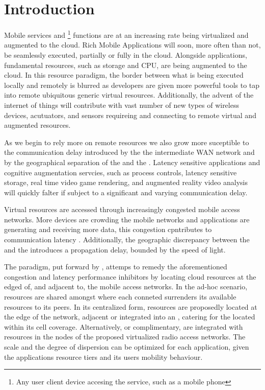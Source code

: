 \section{Introduction}

Mobile services and \ue{} \footnote{Any user client device accesing the service, such as a mobile phone} functions are at an increasing rate being virtualized and augmented to the cloud. Rich Mobile Applications \cite{March2011618} will soon, more often than not, be seamlessly executed, partially or fully in the cloud. Alongside applications, fundamental \ue{} resources, such as storage and CPU, are being augmented to the cloud. In this resource paradigm, the border between what is being executed locally and remotely is blurred as developers are given more powerful tools to tap into remote ubiquitous generic virtual resources. Additionally, the advent of the internet of things will contribute with vast number of new types of wireless devices, acutuators, and sensors requireing and connecting to remote virtual and augmented resources. 


As we begin to rely more on remote resources we also grow more suceptible to the communication delay introduced by the the intermediate WAN network and by the geographical separation of the \ue{} and the \dc{} \cite{choi2007analysis}. Latency sensitive applications and cognitive augmentation servcies, such as process controls, latency sensitive storage, real time video game rendering, and augmented reality video analysis will quickly falter if subject to a significant and varying communication delay.

Virtual resources are accessed through increasingly congested mobile access networks. More devices are crowding the mobile networks and applications are generating and receiving more data, this congestion cpntributes to communication latency \cite{hu2005measurement}. Additionally, the geographic discrepancy between the \ue and the \dc introduces a propagation delay, bounded by the speed of light.

The \xcloud{} paradigm, put forward by \cite{chandra2013decentralized,ericsson_akami,satyanarayanan2009case,kiukkonen2010towards,March2011618}, attemps to remedy the aforementioned congestion and latency performance inhibitors by locating cloud resources at the edged of, and adjacent to, the mobile access networks. In the ad-hoc scenario, resources are shared amongst \ues{} where each conneted \ue{} surrenders its available resources to its peers. In its centralized form, \dc{} resources are proposedly located at the edge of the network, adjacent or integrated into an \rbs{}, catering for the \ues{} located within its cell coverage. Alternatively, or complimentary, \dcs{} are integrated with resources in the nodes of the proposed virtualized radio access networks. The scale and the degree of dispersion can be optimized for each application, given the applications resource tiers and its users mobility behaviour.

